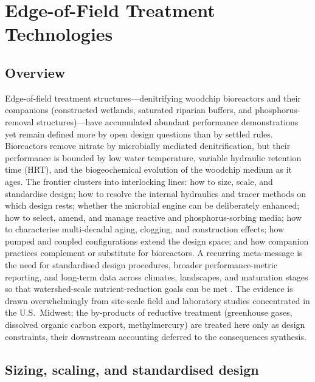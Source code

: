 \section{Edge-of-Field Treatment Technologies}

\subsection{Overview}

Edge-of-field treatment structures---denitrifying woodchip bioreactors and
their companions (constructed wetlands, saturated riparian buffers, and
phosphorus-removal structures)---have accumulated abundant performance
demonstrations yet remain defined more by open design questions than by settled
rules. Bioreactors remove nitrate by microbially mediated denitrification, but
their performance is bounded by low water temperature, variable hydraulic
retention time (HRT), and the biogeochemical evolution of the woodchip medium as
it ages. The frontier clusters into interlocking lines: how to size, scale, and
standardise design; how to resolve the internal hydraulics and tracer methods on
which design rests; whether the microbial engine can be deliberately enhanced;
how to select, amend, and manage reactive and phosphorus-sorbing media; how to
characterise multi-decadal aging, clogging, and construction effects; how
pumped and coupled configurations extend the design space; and how companion
practices complement or substitute for bioreactors. A recurring meta-message is
the need for standardised design procedures, broader performance-metric
reporting, and long-term data across climates, landscapes, and maturation stages
so that watershed-scale nutrient-reduction goals can be met
\parencite{Christianson2021,Maxwell2022,Bell2015}. The evidence is drawn
overwhelmingly from site-scale field and laboratory studies concentrated in the
U.S.\ Midwest; the by-products of reductive treatment (greenhouse gases,
dissolved organic carbon export, methylmercury) are treated here only as design
constraints, their downstream accounting deferred to the consequences synthesis.

\subsection{Sizing, scaling, and standardised design}

